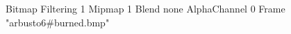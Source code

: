 {Bitmap
	{Filtering 1}
	{Mipmap 1}
	{Blend none}
	{AlphaChannel 0}
	{Frame "arbusto6#burned.bmp"}
}
